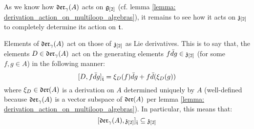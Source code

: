         As we know how $\mathfrak{der}_{\gamma}(A)$ acts on $\mathfrak{g}_{[2]}$ (cf. lemma \ref{lemma: derivation_action_on_multiloop_algebras}), it remains to see how it acts on $\mathfrak{z}_{[2]}$ to completely determine its action on $\mathfrak{t}$. 
        \begin{lemma} \label{lemma: derivation_action_on_toroidal_centres}
            Elements of $\mathfrak{der}_{\gamma}(A)$ act on those of $\mathfrak{z}_{[2]}$ as Lie derivatives. This is to say that, the elements $D \in \mathfrak{der}_{\gamma}(A)$ act on the generating elements $f \bar{d}g \in \mathfrak{z}_{[2]}$ (for some $f, g \in A$) in the following manner:
                $$[D, f \bar{d}g]_{\hat{\mathfrak{t}}} = \xi_D(f) \bar{d}g + f \bar{d}(\xi_D(g))$$
            where $\xi_D \in \mathfrak{der}(A)$ is a derivation on $A$ determined uniquely by $A$ (well-defined because $\mathfrak{der}_{\gamma}(A)$ is a vector subspace of $\mathfrak{der}(A)$ per lemma \ref{lemma: derivation_action_on_multiloop_algebras}). In particular, this means that:
                $$[\mathfrak{der}_{\gamma}(A), \mathfrak{z}_{[2]}]_{\hat{\mathfrak{t}}} \subseteq \mathfrak{z}_{[2]}$$
        \end{lemma}
